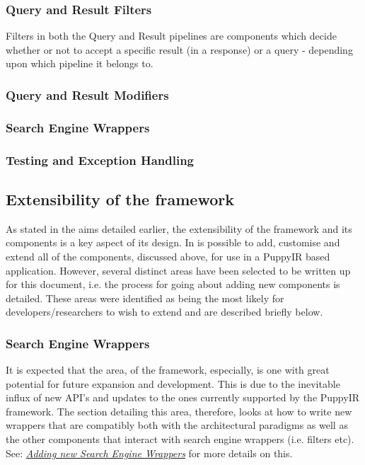 \documentclass[letterpaper,10pt,english]{sphinxmanual}
\begin{document}
\subsubsection{Query and Result Filters}
\label{overview:query-and-result-filters}
Filters in both the Query and Result pipelines are components which decide whether or not to accept a specific result (in a response) or a query - depending upon which pipeline it belongs to.


\subsubsection{Query and Result Modifiers}
\label{overview:query-and-result-modifiers}

\subsubsection{Search Engine Wrappers}
\label{overview:search-engine-wrappers}

\subsubsection{Testing and Exception Handling}
\label{overview:testing-and-exception-handling}

\subsection{Extensibility of the framework}
\label{overview:extensibility-of-the-framework}
As stated in the aims detailed earlier, the extensibility of the framework and its components is a key aspect of its design. In is possible to add, customise and extend all of the components, discussed above, for use in a PuppyIR based application. However, several distinct areas have been selected to be written up for this document, i.e. the process for going about adding new components is detailed. These areas were identified as being the most likely for developers/researchers to wish to extend and are described briefly below.


\subsubsection{Search Engine Wrappers}
\label{overview:id2}
It is expected that the area, of the framework, especially, is one with great potential for future expansion and development. This is due to the inevitable influx of new API's and updates to the ones currently supported by the PuppyIR framework. The section detailing this area, therefore, looks at how to write new wrappers that are compatibly both with the architectural paradigms as well as the other components that interact with search engine wrappers (i.e. filters etc). See: {\hyperref[extendingSearchEngine:extending-the-search-engine]{\emph{Adding new Search Engine Wrappers}}} for more details on this.
\end{document}
